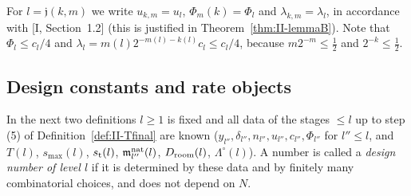 \documentclass[10pt]{amsart}
\theoremstyle{definition}
\theoremstyle{remark}
\begin{document}
For $l=\mathfrak j(k,m)$ we write $u_{k,m}=u_l$, $\Phi_m(k)=\Phi_l$ and
$\lambda_{k,m}=\lambda_l$, in accordance with [I, Section~1.2]
(this is justified in Theorem~\ref{thm:II-lemmaB}).  Note that
$\Phi_l\le c_l/4$ and $\lambda_l=m(l)2^{-m(l)-k(l)}c_l\le c_l/4$, because
$m2^{-m}\le\frac12$ and $2^{-k}\le\frac12$.

\subsection{Design constants and rate objects}

In the next two definitions $l\ge1$ is fixed and all data of the stages
$\le l$ up to step (5) of Definition~\ref{def:II-Tfinal} are known
($y_{l''},\delta_{l''},n_{l''},u_{l''},c_{l''},\Phi_{l''}$ for $l''\le l$, and
$T(l)$, $s_{\max}(l)$, $s_{\rm t}(l)$, $\mathfrak m^{\rm nat}_{l''}(l)$,
$D_{\rm room}(l)$, $\Lambda^\circ(l)$).  A number is called a \emph{design
number of level $l$} if it is determined by these data and by finitely
many combinatorial choices, and does not depend on $N$.
\end{document}
